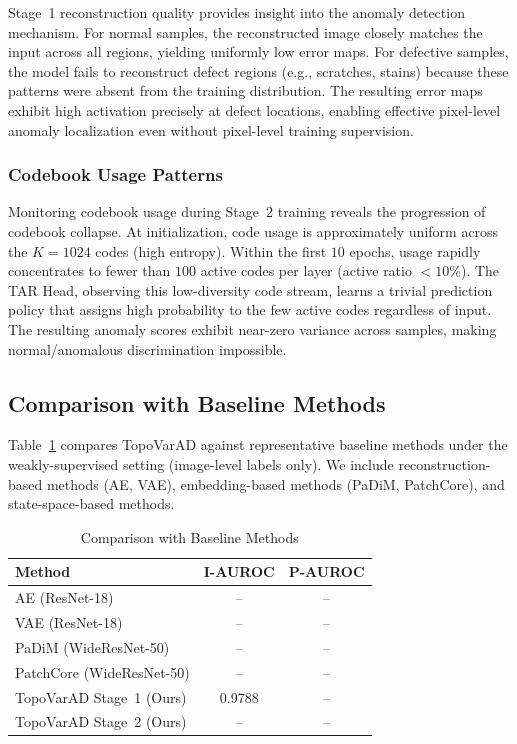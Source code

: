 \documentclass[lettersize,journal]{IEEEtran}
\begin{document}
Stage~1 reconstruction quality provides insight into the anomaly detection mechanism. For normal samples, the reconstructed image closely matches the input across all regions, yielding uniformly low error maps. For defective samples, the model fails to reconstruct defect regions (e.g., scratches, stains) because these patterns were absent from the training distribution. The resulting error maps exhibit high activation precisely at defect locations, enabling effective pixel-level anomaly localization even without pixel-level training supervision.

\subsubsection{Codebook Usage Patterns}

Monitoring codebook usage during Stage~2 training reveals the progression of codebook collapse. At initialization, code usage is approximately uniform across the $K = 1024$ codes (high entropy). Within the first $10$ epochs, usage rapidly concentrates to fewer than $100$ active codes per layer (active ratio $< 10\%$). The TAR Head, observing this low-diversity code stream, learns a trivial prediction policy that assigns high probability to the few active codes regardless of input. The resulting anomaly scores exhibit near-zero variance across samples, making normal/anomalous discrimination impossible.

\subsection{Comparison with Baseline Methods}

Table~\ref{tab:comparison} compares TopoVarAD against representative baseline methods under the weakly-supervised setting (image-level labels only). We include reconstruction-based methods (AE, VAE), embedding-based methods (PaDiM, PatchCore), and state-space-based methods.

\begin{table}[!t]
\caption{Comparison with Baseline Methods\label{tab:comparison}}
\centering
\begin{tabular}{@{}lcc@{}}
\toprule
\textbf{Method} & \textbf{I-AUROC} & \textbf{P-AUROC} \\
\midrule
AE (ResNet-18) & -- & -- \\
VAE (ResNet-18) & -- & -- \\
PaDiM (WideResNet-50) & -- & -- \\
PatchCore (WideResNet-50) & -- & -- \\
\hline
TopoVarAD Stage~1 (Ours) & 0.9788 & -- \\
TopoVarAD Stage~2 (Ours) & -- & -- \\
\bottomrule
\end{tabular}
\end{table}
\end{document}
